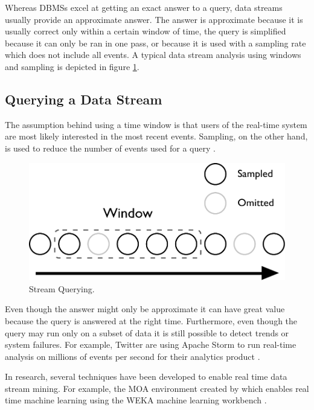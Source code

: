 \documentclass[bsc,logo,frontabs,twoside,singlespacing,normalheadings,parskip]{infthesis}\usepackage[]{graphicx}\usepackage[]{color}
\begin{document}
Whereas DBMSs excel at getting an exact answer to a query, data streams usually provide an approximate answer. The answer is approximate because it is usually correct only within a certain window of time, the query is simplified because it can only be ran in one pass, or because it is used with a sampling rate which does not include all events. A typical data stream analysis using windows and sampling is depicted in figure \ref{fig:stream}.

\subsection{Querying a Data Stream}

The assumption behind using a time window is that users of the real-time system are most likely interested in the most recent events. Sampling, on the other hand, is used to reduce the number of events used for a query \citep{Gaber:2005:MDS:1083784.1083789}.

\begin{figure}[!htb]
	\centering
	\includegraphics[scale=0.5]{pdf/stream.pdf}
	\caption{Stream Querying.}
	\label{fig:stream}
\end{figure}

Even though the answer might only be approximate it can have great value because the query is answered at the right time. Furthermore, even though the query may run only on a subset of data it is still possible to detect trends or system failures. For example, Twitter are using Apache Storm to run real-time analysis on millions of events per second for their analytics product \citep{Solovey}.

In research, several techniques have been developed to enable real time data stream mining. For example, the MOA environment created by \citet{Bifet:2010:MMO:1756006.1859903} which enables real time machine learning using the WEKA machine learning workbench \citep{Holmes1994}.
\end{document}
